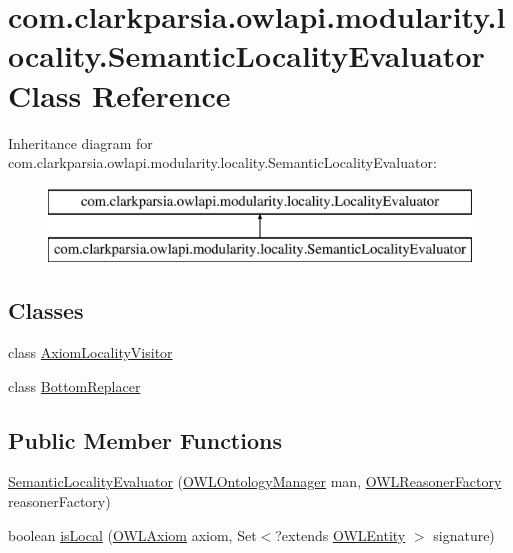 \hypertarget{classcom_1_1clarkparsia_1_1owlapi_1_1modularity_1_1locality_1_1_semantic_locality_evaluator}{\section{com.\-clarkparsia.\-owlapi.\-modularity.\-locality.\-Semantic\-Locality\-Evaluator Class Reference}
\label{classcom_1_1clarkparsia_1_1owlapi_1_1modularity_1_1locality_1_1_semantic_locality_evaluator}
}
Inheritance diagram for com.\-clarkparsia.\-owlapi.\-modularity.\-locality.\-Semantic\-Locality\-Evaluator\-:\begin{figure}[H]
\begin{center}
\leavevmode
\includegraphics[height=2.000000cm]{classcom_1_1clarkparsia_1_1owlapi_1_1modularity_1_1locality_1_1_semantic_locality_evaluator}
\end{center}
\end{figure}
\subsection*{Classes}
\begin{DoxyCompactItemize}
\item 
class \hyperlink{classcom_1_1clarkparsia_1_1owlapi_1_1modularity_1_1locality_1_1_semantic_locality_evaluator_1_1_axiom_locality_visitor}{Axiom\-Locality\-Visitor}
\item 
class \hyperlink{classcom_1_1clarkparsia_1_1owlapi_1_1modularity_1_1locality_1_1_semantic_locality_evaluator_1_1_bottom_replacer}{Bottom\-Replacer}
\end{DoxyCompactItemize}
\subsection*{Public Member Functions}
\begin{DoxyCompactItemize}
\item 
\hyperlink{classcom_1_1clarkparsia_1_1owlapi_1_1modularity_1_1locality_1_1_semantic_locality_evaluator_aeaf49bc3d04b5a08e2bd9eaa537ab7c8}{Semantic\-Locality\-Evaluator} (\hyperlink{interfaceorg_1_1semanticweb_1_1owlapi_1_1model_1_1_o_w_l_ontology_manager}{O\-W\-L\-Ontology\-Manager} man, \hyperlink{interfaceorg_1_1semanticweb_1_1owlapi_1_1reasoner_1_1_o_w_l_reasoner_factory}{O\-W\-L\-Reasoner\-Factory} reasoner\-Factory)
\item 
boolean \hyperlink{classcom_1_1clarkparsia_1_1owlapi_1_1modularity_1_1locality_1_1_semantic_locality_evaluator_a2097adfe20a5b510c73a3d7377fe4b7b}{is\-Local} (\hyperlink{interfaceorg_1_1semanticweb_1_1owlapi_1_1model_1_1_o_w_l_axiom}{O\-W\-L\-Axiom} axiom, Set$<$?extends \hyperlink{interfaceorg_1_1semanticweb_1_1owlapi_1_1model_1_1_o_w_l_entity}{O\-W\-L\-Entity} $>$ signature)
\end{DoxyCompactItemize}
